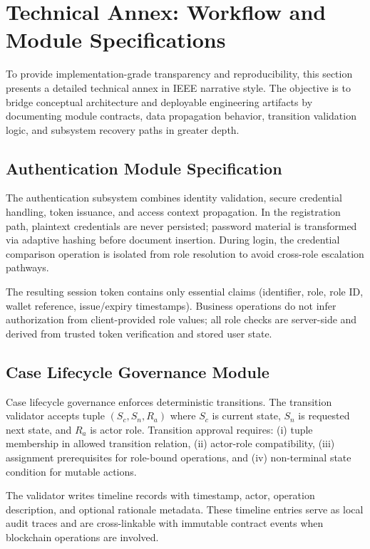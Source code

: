 \documentclass[conference]{IEEEtran}
\begin{document}
\section{Technical Annex: Workflow and Module Specifications}
To provide implementation-grade transparency and reproducibility, this section presents a detailed technical annex in IEEE narrative style. The objective is to bridge conceptual architecture and deployable engineering artifacts by documenting module contracts, data propagation behavior, transition validation logic, and subsystem recovery paths in greater depth.

\subsection{Authentication Module Specification}
The authentication subsystem combines identity validation, secure credential handling, token issuance, and access context propagation. In the registration path, plaintext credentials are never persisted; password material is transformed via adaptive hashing before document insertion. During login, the credential comparison operation is isolated from role resolution to avoid cross-role escalation pathways.

The resulting session token contains only essential claims (identifier, role, role ID, wallet reference, issue/expiry timestamps). Business operations do not infer authorization from client-provided role values; all role checks are server-side and derived from trusted token verification and stored user state.

\subsection{Case Lifecycle Governance Module}
Case lifecycle governance enforces deterministic transitions. The transition validator accepts tuple $(S_c, S_n, R_a)$ where $S_c$ is current state, $S_n$ is requested next state, and $R_a$ is actor role. Transition approval requires: (i) tuple membership in allowed transition relation, (ii) actor-role compatibility, (iii) assignment prerequisites for role-bound operations, and (iv) non-terminal state condition for mutable actions.

The validator writes timeline records with timestamp, actor, operation description, and optional rationale metadata. These timeline entries serve as local audit traces and are cross-linkable with immutable contract events when blockchain operations are involved.
\end{document}
